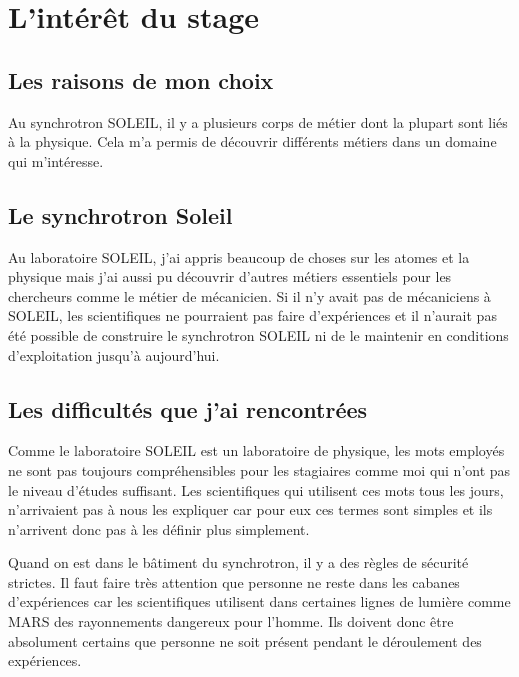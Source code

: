 \chapter{L'intérêt du stage}
	\minitoc
	





\section{Les raisons de mon choix}
    Au synchrotron SOLEIL, il y a plusieurs corps de métier dont la plupart sont liés à la physique. Cela m'a permis de découvrir différents métiers dans un domaine qui m'intéresse.
	
\section{Le synchrotron Soleil}
    Au laboratoire SOLEIL, j'ai appris beaucoup de choses sur les atomes et la physique mais j'ai aussi pu découvrir d'autres métiers essentiels pour les chercheurs comme le métier de mécanicien. Si il n'y avait pas de mécaniciens à SOLEIL, les scientifiques ne pourraient pas faire d'expériences et il n'aurait pas été possible de construire le synchrotron SOLEIL ni de le maintenir en conditions d'exploitation jusqu'à aujourd'hui. 

\section{Les difficultés que j'ai rencontrées}
    Comme le laboratoire SOLEIL est un laboratoire de physique, les mots employés ne sont pas toujours compréhensibles pour les stagiaires comme moi qui n'ont pas le niveau d'études suffisant. Les scientifiques qui utilisent ces mots tous les jours, n'arrivaient pas à nous les expliquer car pour eux ces termes sont simples et ils n'arrivent donc pas à les définir plus simplement. 
    
    Quand on est dans le bâtiment du synchrotron, il y a des règles de sécurité strictes. Il faut faire très attention que personne ne reste dans les cabanes d'expériences car les scientifiques utilisent dans certaines lignes de lumière comme MARS des rayonnements dangereux pour l'homme. Ils doivent donc être absolument certains que personne ne soit présent pendant le déroulement des expériences.

%
%